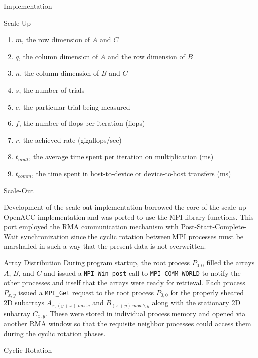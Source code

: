 \documentclass{article}
\begin{document}
\begin{section}{Implementation}
\begin{subsection}{Scale-Up}
\begin{paragraph}{}
\begin{enumerate}
      \item{$m$, the row dimension of $A$ and $C$}
      \item{$q$, the column dimension of $A$ and the row dimension of $B$}
      \item{$n$, the column dimension of $B$ and $C$}
      \item{$s$, the number of trials}
      \item{$e$, the particular trial being measured}
      \item{$f$, the number of flops per iteration (flops)}
      \item{$r$, the achieved rate (gigaflops/sec)}
      \item{$t_{mult}$, the average time spent per iteration on multiplication (ms)}
      \item{$t_{comm}$, the time spent in host-to-device or device-to-host transfers (ms)}
      \end{enumerate}
    \end{paragraph}
  \end{subsection}
  \begin{subsection}{Scale-Out}
    \begin{paragraph}{}
      Development of the scale-out implementation borrowed the core of the scale-up OpenACC implementation and was ported
      to use the MPI library functions. This port employed the RMA communication mechanism with Post-Start-Complete-Wait synchronization\autocite[][456-463]{MPIReport31} since
      the cyclic rotation between MPI processes must be marshalled in such a way that the present data is not overwritten.
    \end{paragraph}
    \begin{paragraph}{Array Distribution}
      During program startup, the root process $P_{0,0}$ filled the arrays $A$, $B$, and $C$ and issued a \texttt{MPI\_Win\_post} call to \texttt{MPI\_COMM\_WORLD}
      to notify the other processes and itself that the arrays were ready for retrieval. Each process $P_{x,y}$ issued a \texttt{MPI\_Get} request
      to the root process $P_{0,0}$ for the properly sheared 2D subarrays $A_{x,(y+x)\ mod\ c}$ and $B_{(x+y)\ mod\ b, y}$ along with the stationary
      2D subarray $C_{x,y}$. These were stored in individual process memory and opened via another RMA window so that the requisite neighbor processes
      could access them during the cyclic rotation phases.
    \end{paragraph}
    \begin{paragraph}{Cyclic Rotation}

\end{paragraph}
\end{subsection}
\end{section}
\end{document}
